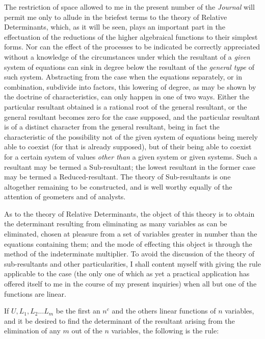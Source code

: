 \documentclass[11pt]{article}
\begin{document}
{{The restriction of space allowed to me in the present number of the \emph{Journal} will permit me only to allude in the briefest terms to the theory of Relative Determinants, which, as it will be seen, plays an important part in the effectuation of the reductions of the higher algebraical functions to their simplest forms. Nor can the effect of the processes to be indicated be correctly appreciated without a knowledge of the circumstances under which the resultant of a \emph{given} system of equations can sink in degree below the resultant of the \emph{general type} of such system. Abstracting from the case when the equations separately, or in combination, subdivide into factors, this lowering of degree, as may be shown by the doctrine of characteristics, can only happen in one of two ways. Either the particular resultant obtained is a rational root of the general resultant, or the general resultant becomes zero for the case supposed, and the particular resultant is of a distinct character from the general resultant, being in fact the characteristic of the possibility not of the given system of equations being merely able to coexist (for that is already supposed), but of their being able to coexist for a certain system of values \emph{other than} a given system or given systems. Such a resultant may be termed a Sub-resultant; the lowest resultant in the former case may be termed a Reduced-resultant. The theory of Sub-resultants is one altogether remaining to be constructed, and is well worthy equally of the attention of geometers and of analysts.

As to the theory of Relative Determinants, the object of this theory is to obtain the determinant resulting from eliminating as many variables as can be eliminated, chosen at pleasure from a set of variables greater in number than the equations containing them; and the mode of effecting this object is through the method of the indeterminate multiplier. To avoid the discussion of the theory of sub-resultants and other particularities, I shall content myself with giving the rule applicable to the case (the only one of which as yet a practical application has offered itself to me in the course of my present inquiries) when all but one of the functions are linear.

If $U,L_1,L_2\ldots L_m$ be the first an $n^c$ and the others linear functions of $n$ variables, and it be desired to find the determinant of the resultant arising from the elimination of any $m$ out of the $n$ variables, the following is the rule:

}}
\end{document}

